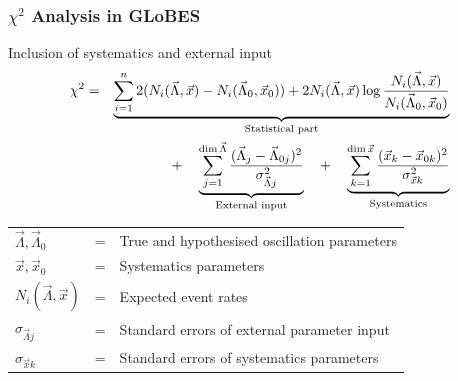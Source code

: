 \documentclass{beamer}
\begin{document}
\begin{frame}
  \frametitle{$\chi^2$ Analysis in GLoBES}
  \begin{block}{Inclusion of systematics and external input}
    \begin{eqnarray*}
      \chi^2 &=& \underbrace{\sum_{i=1}^n 
                    2 (N_i(\vec{\Lambda},\vec{x}) - N_i(\vec{\Lambda}_0,\vec{x}_0))
                          + 2 N_i(\vec{\Lambda},\vec{x})
                                   \log \frac{N_i(\vec{\Lambda},\vec{x})}{N_i(\vec{\Lambda}_0,\vec{x}_0)}}
                           _{\textnormal{Statistical part}}   \\
          && + \ \ \ \underbrace{\sum_{j=1}^{\dim{\vec{\Lambda}}}
                   \frac{(\vec{\Lambda}_j - \vec{\Lambda}_{0j})^2}{\sigma_{\vec{\Lambda}j}^2}}
                           _{\textnormal{External input}} \ \ \
             + \ \ \ \underbrace{\sum_{k=1}^{\dim{\vec{x}}} \frac{(\vec{x}_k - \vec{x}_{0k})^2}{\sigma_{\vec{x}k}^2}}
                           _{\textnormal{Systematics}}
    \end{eqnarray*}
  \end{block}
  \small
  \begin{tabular}{lcl}
    $\vec{\Lambda}, \vec{\Lambda}_0$  &=& True and hypothesised oscillation parameters             \\
    $\vec{x}, \vec{x}_0$              &=& Systematics parameters                                   \\
    $N_i(\vec{\Lambda},\vec{x})$      &=& Expected event rates                                     \\
    $\sigma_{\vec{\Lambda}j}$         &=& Standard errors of external parameter input              \\
    $\sigma_{\vec{x}k}$               &=& Standard errors of systematics parameters 
  \end{tabular}
\end{frame}
\end{document}
